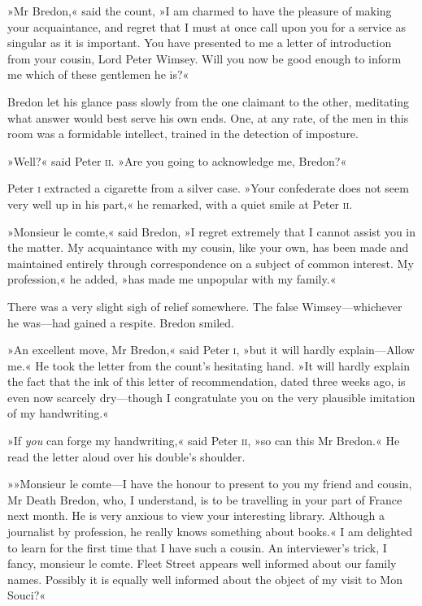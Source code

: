 »Mr Bredon,« said the count, »I am charmed to have the pleasure of making your acquaintance, and regret that I must at once call upon you for a service as singular as it is important. You have presented to me a letter of introduction from your cousin, Lord Peter Wimsey. Will you now be good enough to inform me which of these gentlemen he is?«

Bredon let his glance pass slowly from the one claimant to the other, meditating what answer would best serve his own ends. One, at any rate, of the men in this room was a formidable intellect, trained in the detection of imposture.

»Well?« said Peter \textsc{ii}. »Are you going to acknowledge me, Bredon?«

Peter \textsc{i} extracted a cigarette from a silver case. »Your confederate does not seem very well up in his part,« he remarked, with a quiet smile at Peter \textsc{ii}.

»Monsieur le comte,« said Bredon, »I regret extremely that I cannot assist you in the matter. My acquaintance with my cousin, like your own, has been made and maintained entirely through correspondence on a subject of common interest. My profession,« he added, »has made me unpopular with my family.«

There was a very slight sigh of relief somewhere. The false Wimsey—whichever he was—had gained a respite. Bredon smiled.

»An excellent move, Mr Bredon,« said Peter \textsc{i}, »but it will hardly explain—Allow me.« He took the letter from the count's hesitating hand. »It will hardly explain the fact that the ink of this letter of recommendation, dated three weeks ago, is even now scarcely dry—though I congratulate you on the very plausible imitation of my handwriting.«

»If \textit{you} can forge my handwriting,« said Peter \textsc{ii}, »so can this Mr Bredon.« He read the letter aloud over his double's shoulder.

»»Monsieur le comte—I have the honour to present to you my friend and cousin, Mr Death Bredon, who, I understand, is to be travelling in your part of France next month. He is very anxious to view your interesting library. Although a journalist by profession, he really knows something about books.« I am delighted to learn for the first time that I have such a cousin. An interviewer's trick, I fancy, monsieur le comte. Fleet Street appears well informed about our family names. Possibly it is equally well informed about the object of my visit to Mon Souci?«

